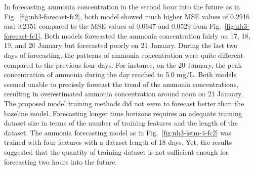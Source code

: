 In forecasting ammonia concentration in the second hour into the future as in Fig.~\ref{fig:nh3-forecast-fc2}, both model showed much higher MSE values of 0.2916 and 0.2351 compared to the MSE values of 0.0647 and 0.0529 from Fig.~\ref{fig:nh3-forecast-fc1}. Both models forecasted the ammonia concentration fairly on 17, 18, 19, and 20 January but forecasted poorly on 21 January. During the last two days of forecasting, the patterns of ammonia concentration were quite different compared to the previous four days. For instance, on the 20 January, the peak concentration of ammonia during the day reached to 5.0 mg/L. Both models seemed unable to precisely forecast the trend of the ammonia concentrations, resulting in overestimated ammonia concentration around noon on 21 January. The proposed model training methods did not seem to forecast better than the baseline model. Forecasting longer time horizons requires an adequate training dataset size in terms of the number of training features and the length of the dataset. The ammonia forecasting model as in Fig.~\ref{fig:nh3-lstm-4-fc2} was trained with four features with a dataset length of 18 days. Yet, the results suggested that the quantity of training dataset is not sufficient enough for forecasting two hours into the future.

